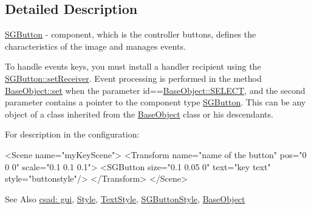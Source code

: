 \subsection{Detailed Description}
\hyperlink{classcsad_1_1_s_g_button}{S\-G\-Button} -\/ component, which is the controller buttons, defines the characteristics of the image and manages events. 

To handle events keys, you must install a handler recipient using the \hyperlink{classcsad_1_1_s_g_element_a1a8aaf98a4fb6960e00365000b44bff9}{S\-G\-Button\-::set\-Receiver}. Event processing is performed in the method \hyperlink{classcsad_1_1_base_object_aa8d3a855874527b14a5c56f629789b1f}{Base\-Object\-::set} when the parameter id==\hyperlink{classcsad_1_1_base_object_a27d9db492c1a385aa4086da1824e2737a1ad754d1312e455b8585419a33bba1bf}{Base\-Object\-::\-S\-E\-L\-E\-C\-T}, and the second parameter contains a pointer to the component type \hyperlink{classcsad_1_1_s_g_button}{S\-G\-Button}. This can be any object of a class inherited from the \hyperlink{classcsad_1_1_base_object}{Base\-Object} class or his descendants.

For description in the configuration\-: \begin{DoxyVerb}  <Scene name="myKeyScene">
    <Transform name="name of the button" pos="0 0 0" scale="0.1 0.1 0.1">
      <SGButton size="0.1 0.05 0" text="key text" style="buttonstyle"/>
    </Transform>
  </Scene>
\end{DoxyVerb}


\begin{DoxySeeAlso}{See Also}
\hyperlink{group__scenegui}{csad\-: gui}, \hyperlink{classcsad_1_1_style}{Style}, \hyperlink{classcsad_1_1_text_style}{Text\-Style}, \hyperlink{classcsad_1_1_s_g_button_style}{S\-G\-Button\-Style}, \hyperlink{classcsad_1_1_base_object}{Base\-Object} 
\end{DoxySeeAlso}
